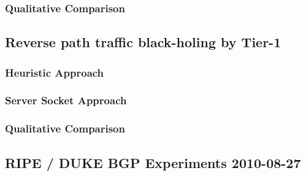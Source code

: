 \subsubsection{Qualitative Comparison}


\subsection{Reverse path traffic black-holing by Tier-1}


\subsubsection{Heuristic Approach}

\subsubsection{Server Socket Approach}

\subsubsection{Qualitative Comparison}


\subsection{RIPE / DUKE BGP Experiments 2010-08-27}

